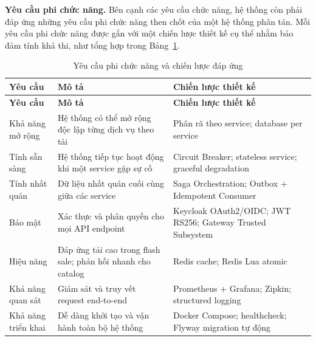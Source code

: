 \documentclass[../DoAn.tex]{subfiles}
\begin{document}
\textbf{Yêu cầu phi chức năng.} Bên cạnh các yêu cầu chức năng, hệ thống còn phải đáp ứng những
yêu cầu phi chức năng then chốt của một hệ thống phân tán. Mỗi yêu cầu phi chức năng được gắn
với một chiến lược thiết kế cụ thể nhằm bảo đảm tính khả thi, như tổng hợp trong Bảng~\ref{table:nfr}.

{%
\small\setlength{\tabcolsep}{3pt}\renewcommand{\arraystretch}{1.15}%
\begin{longtable}{|p{2.8cm}|p{7.3cm}|p{4.2cm}|}
\caption{Yêu cầu phi chức năng và chiến lược đáp ứng}
\label{table:nfr} \\
\hline
\textbf{Yêu cầu} & \textbf{Mô tả} & \textbf{Chiến lược thiết kế} \\ \hline
\endfirsthead
\hline
\textbf{Yêu cầu} & \textbf{Mô tả} & \textbf{Chiến lược thiết kế} \\ \hline
\endhead
Khả năng mở rộng  & Hệ thống có thể mở rộng độc lập từng dịch vụ theo tải
                  & Phân rã theo service; database per service \\ \hline
Tính sẵn sàng    & Hệ thống tiếp tục hoạt động khi một service gặp sự cố
                  & Circuit Breaker; stateless service; graceful degradation \\ \hline
Tính nhất quán   & Dữ liệu nhất quán cuối cùng giữa các service
                  & Saga Orchestration; Outbox + Idempotent Consumer \\ \hline
Bảo mật          & Xác thực và phân quyền cho mọi API endpoint
                  & Keycloak OAuth2/OIDC; JWT RS256; Gateway Trusted Subsystem \\ \hline
Hiệu năng        & Đáp ứng tải cao trong flash sale; phản hồi nhanh cho catalog
                  & Redis cache; Redis Lua atomic \\ \hline
Khả năng quan sát & Giám sát và truy vết request end-to-end
                  & Prometheus + Grafana; Zipkin; structured logging \\ \hline
Khả năng triển khai & Dễ dàng khởi tạo và vận hành toàn bộ hệ thống
                  & Docker Compose; healthcheck; Flyway migration tự động \\ \hline
\end{longtable}


}
\end{document}
